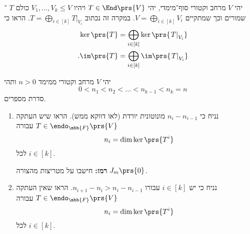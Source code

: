 \documentclass[a4paper,10pt,twoside,openany]{article}
\begin{document}
\begin{exercise}
יהי
$V$
מרחב וקטורי סוף־מימדי, יהי
$T \in \End\prs{V}$
ויהיו
$V_1, \ldots, V_k \leq V$
כולם
$T$%
־שמורים וכך שמתקיים
$V = \bigoplus_{i \in [k]} V_i$.
במקרה זה נכתוב
$T = \bigoplus_{i \in [k]} \left. T \right|_{V_i}$.
הראו כי
\begin{align*}
\ker\prs{T} &= \bigoplus_{i \in [k]} \ker\prs{\left. T \right|_{V_i}} \\
\text{.} \im\prs{T} &= \bigoplus_{i \in [k]} \im\prs{\left. T \right|_{V_i}}
\end{align*}
\end{exercise}

\begin{exercise}
יהי
$V$
מרחב וקטורי ממימד
$n > 0$
ותהי
\[0 < n_1 < n_2 < \ldots < n_{k-1} < n_k = n\]
סדרת מספרים.

\begin{enumerate}
\item נניח כי
$n_i - n_{i-1}$
מונוטונית יורדת (לאו דווקא ממש).
הראו שיש העתקה
$T \in \endo_{\mbb{F}}\prs{V}$
עבורה
\[n_i = \dim\ker\prs{T^i}\]
לכל
$i \in [k]$.

\textbf{רמז:}
חישבו על מטריצות מהצורה
$J_m\prs{0}$.

\item נניח כי יש
$i \in [k]$
עבורו
$n_{i+1} - n_i > n_i - n_{i-1}$.
הראו שאין העתקה
$T \in \endo_{\mbb{F}}\prs{V}$
עבורה
\[n_i = \dim\ker\prs{T^i}\]
לכל
$i \in [k]$.
\end{enumerate}
\end{exercise}
\end{document}
